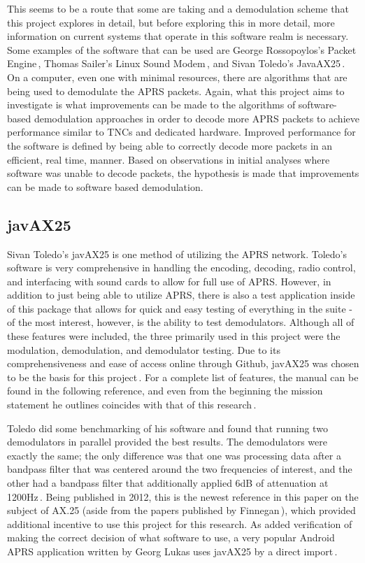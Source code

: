 This seems to be a route that some are taking and a demodulation scheme that this project explores in detail, but before exploring this in more detail, more information on current systems that operate in this software realm is necessary. Some examples of the software that can be used are George Rossopoylos's Packet Engine\,\cite{Rossopoylos}, Thomas Sailer's Linux Sound Modem\,\cite{Sailer1997,Sailer2000}, and Sivan Toledo's JavaAX25\,\cite{javax25github, Toledo2012a}. On a computer, even one with minimal resources, there are algorithms that are being used to demodulate the APRS packets. Again, what this project aims to investigate is what improvements can be made to the algorithms of software-based demodulation approaches in order to decode more APRS packets to achieve performance similar to TNCs and dedicated hardware. Improved performance for the software is defined by being able to correctly decode more packets in an efficient, real time, manner. Based on observations in initial analyses where software was unable to decode packets, the hypothesis is made that improvements can be made to software based demodulation.

\subsection{javAX25}
Sivan Toledo's javAX25 is one method of utilizing the APRS network. Toledo's software is very comprehensive in handling the encoding, decoding, radio control, and interfacing with sound cards to allow for full use of APRS. However, in addition to just being able to utilize APRS, there is also a test application inside of this package that allows for quick and easy testing of everything in the suite - of the most interest, however, is the ability to test demodulators. Although all of these features were included, the three primarily used in this project were the modulation, demodulation, and demodulator testing. Due to its comprehensiveness and ease of access online through Github, javAX25 was chosen to be the basis for this project\,\cite{javax25github}. For a complete list of features, the manual can be found in the following reference, and even from the beginning the mission statement he outlines coincides with that of this research\,\cite{Toledo2012a}.

Toledo did some benchmarking of his software and found that running two demodulators in parallel provided the best results. The demodulators were exactly the same; the only difference was that one was processing data after a bandpass filter that was centered around the two frequencies of interest, and the other had a bandpass filter that additionally applied 6dB of attenuation at 1200Hz\,\cite{Toledo2012}. Being published in 2012, this is the newest reference in this paper on the subject of AX.25 (aside from the papers published by Finnegan\,\cite{KWFThesis, KWFTAPR}), which provided additional incentive to use this project for this research. As added verification of making the correct decision of what software to use, a very popular Android APRS application written by Georg Lukas uses javAX25 by a direct import\,\cite{APRSdroid}.